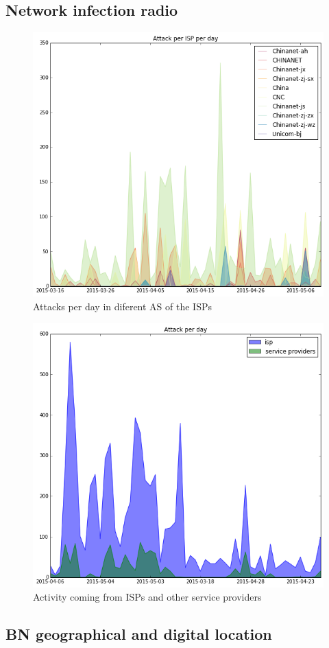 \subsection{Network infection radio}


\begin{figure}[h]
     \caption{Attacks per day in diferent AS of the ISPs }
     \label{fig:isp_day}
    \centering
    \includegraphics[width=\linewidth]{images/isp_legend_area}
\end{figure}


\begin{figure}[h]
    \caption{Activity coming from ISPs and other service providers}
    \label{fig:as_day}
    \centering
    \includegraphics[width=\linewidth]{images/isp_no_isp_area}
\end{figure}
\subsection{BN geographical and digital location}
